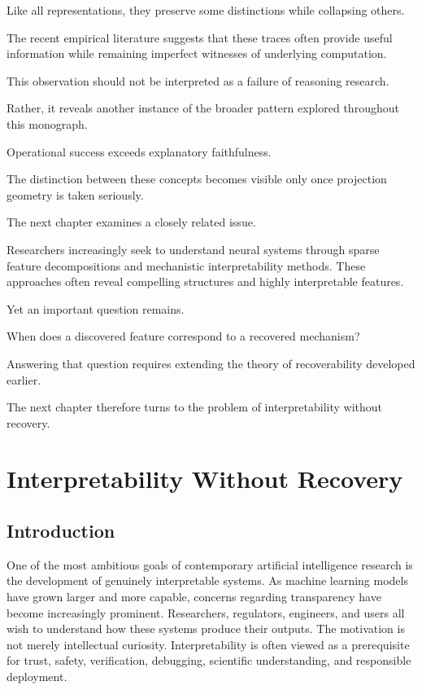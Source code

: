 \documentclass[11pt,oneside,openany]{book}
\begin{document}
Like all representations, they preserve some distinctions while collapsing others.

The recent empirical literature suggests that these traces often provide useful information while remaining imperfect witnesses of underlying computation.

This observation should not be interpreted as a failure of reasoning research.

Rather, it reveals another instance of the broader pattern explored throughout this monograph.

Operational success exceeds explanatory faithfulness.

The distinction between these concepts becomes visible only once projection geometry is taken seriously.

The next chapter examines a closely related issue.

Researchers increasingly seek to understand neural systems through sparse feature decompositions and mechanistic interpretability methods. These approaches often reveal compelling structures and highly interpretable features.

Yet an important question remains.

When does a discovered feature correspond to a recovered mechanism?

Answering that question requires extending the theory of recoverability developed earlier.

The next chapter therefore turns to the problem of interpretability without recovery.

\chapter{Interpretability Without Recovery}

\section{Introduction}

One of the most ambitious goals of contemporary artificial intelligence research is the development of genuinely interpretable systems. As machine learning models have grown larger and more capable, concerns regarding transparency have become increasingly prominent. Researchers, regulators, engineers, and users all wish to understand how these systems produce their outputs. The motivation is not merely intellectual curiosity. Interpretability is often viewed as a prerequisite for trust, safety, verification, debugging, scientific understanding, and responsible deployment.
\end{document}
